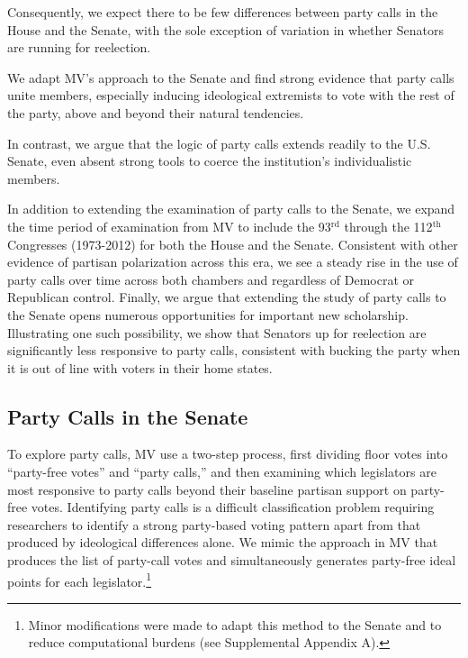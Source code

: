 \documentclass[12pt]{article}
\begin{document}
Consequently, we expect there to be few differences between party calls in the
House and the Senate, with the sole exception of variation in whether
Senators are running for reelection.

We adapt MV's approach to the Senate and find strong evidence that party calls
unite members, especially inducing ideological extremists to vote with the rest
of the party, above and beyond their natural tendencies.

In contrast, we argue that the logic of party calls extends readily
to the U.S. Senate, even absent strong tools to coerce the institution's
individualistic members.



In addition to extending the examination of party calls to the Senate, we
expand the time period of examination from MV to include the 93$^{\text{rd}}$
through the 112$^{\text{th}}$ Congresses (1973-2012) for both the House and the
Senate.
Consistent with other evidence of partisan polarization across this era, we see
a steady rise in the use of party calls over time across both chambers and
regardless of Democrat or Republican control.
Finally, we argue that extending the study of party calls to the Senate opens
numerous opportunities for important new scholarship.
Illustrating one such possibility, we show that Senators up for reelection are
significantly less responsive to party calls, consistent with bucking the party
when it is out of line with voters in their home states.


\subsection*{Party Calls in the Senate}

To explore party calls, MV use a two-step process, first dividing floor votes into ``party-free votes'' and ``party calls,'' and then examining which legislators are most responsive to party calls beyond their baseline partisan support on party-free votes.  Identifying party calls is a difficult classification problem requiring researchers to identify a strong party-based voting pattern apart from that produced by ideological differences alone.  We mimic the approach in MV that produces the list of party-call votes and simultaneously generates party-free ideal points for each legislator.\footnote{\doublespacing\normalsize Minor modifications were made to adapt this method to the Senate and to reduce computational burdens (see Supplemental Appendix A).}
\end{document}
